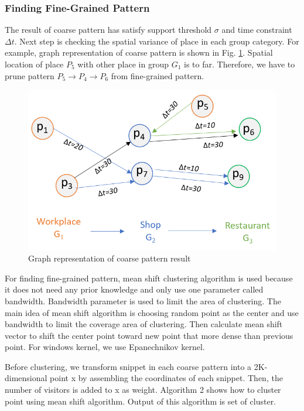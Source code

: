 \documentclass[conference]{IEEEtran}
\begin{document}
\subsubsection{Finding Fine-Grained Pattern}
The result of coarse pattern has satisfy support threshold $\sigma$ and time constraint $\Delta t$. Next step is checking the spatial variance of place in each group category. For example, graph representation of coarse pattern is shown in Fig. \ref{fig:graph-coarse-pattern}. Spatial location of place $P_{5}$ with other place in group $G_{1}$ is to far. Therefore, we have to prune pattern $P_{5}\rightarrow P_{4}\rightarrow P_{6}$ from fine-grained pattern. 

\begin{figure}[!h]
	\centering
	\includegraphics[width=1\linewidth]{graph_coarse_pattern}
	\caption{Graph representation of coarse pattern result}
	\label{fig:graph-coarse-pattern}
\end{figure}

For finding fine-grained pattern, mean shift clustering algorithm is used because it does not need any prior knowledge and only use one parameter called bandwidth. Bandwidth parameter is used to limit the area of clustering. The main idea of mean shift algorithm is choosing random point as the center and use bandwidth to limit the coverage area of clustering. Then calculate mean shift vector to shift the center point toward new point that more dense than previous point. For windows kernel, we use Epanechnikov kernel. 
\par
Before clustering, we transform snippet in each coarse pattern into a 2K-dimensional point x by assembling the coordinates of each snippet. Then, the number of visitors is added to x as weight. Algorithm 2 shows how to cluster point using mean shift algorithm. Output of this algorithm is set of cluster.
\end{document}

